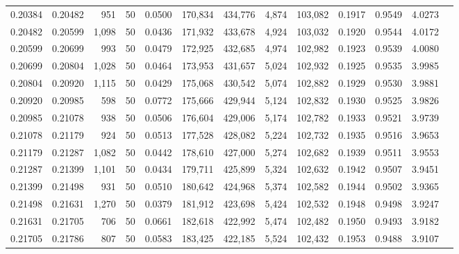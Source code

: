 \begin{tabular}{rrrrrrrrrrrrr}
0.20384 & 0.20482 &   951 &  50 &                                     0.0500 & 170,834 & 434,776 &   4,874 & 103,082 & 0.1917 & 0.9549 & 4.0273 \\
0.20482 & 0.20599 & 1,098 &  50 &                                     0.0436 & 171,932 & 433,678 &   4,924 & 103,032 & 0.1920 & 0.9544 & 4.0172 \\
0.20599 & 0.20699 &   993 &  50 &                                     0.0479 & 172,925 & 432,685 &   4,974 & 102,982 & 0.1923 & 0.9539 & 4.0080 \\
0.20699 & 0.20804 & 1,028 &  50 &                                     0.0464 & 173,953 & 431,657 &   5,024 & 102,932 & 0.1925 & 0.9535 & 3.9985 \\
0.20804 & 0.20920 & 1,115 &  50 &                                     0.0429 & 175,068 & 430,542 &   5,074 & 102,882 & 0.1929 & 0.9530 & 3.9881 \\
0.20920 & 0.20985 &   598 &  50 &                                     0.0772 & 175,666 & 429,944 &   5,124 & 102,832 & 0.1930 & 0.9525 & 3.9826 \\
0.20985 & 0.21078 &   938 &  50 &                                     0.0506 & 176,604 & 429,006 &   5,174 & 102,782 & 0.1933 & 0.9521 & 3.9739 \\
0.21078 & 0.21179 &   924 &  50 &                                     0.0513 & 177,528 & 428,082 &   5,224 & 102,732 & 0.1935 & 0.9516 & 3.9653 \\
0.21179 & 0.21287 & 1,082 &  50 &                                     0.0442 & 178,610 & 427,000 &   5,274 & 102,682 & 0.1939 & 0.9511 & 3.9553 \\
0.21287 & 0.21399 & 1,101 &  50 &                                     0.0434 & 179,711 & 425,899 &   5,324 & 102,632 & 0.1942 & 0.9507 & 3.9451 \\
0.21399 & 0.21498 &   931 &  50 &                                     0.0510 & 180,642 & 424,968 &   5,374 & 102,582 & 0.1944 & 0.9502 & 3.9365 \\
0.21498 & 0.21631 & 1,270 &  50 &                                     0.0379 & 181,912 & 423,698 &   5,424 & 102,532 & 0.1948 & 0.9498 & 3.9247 \\
0.21631 & 0.21705 &   706 &  50 &                                     0.0661 & 182,618 & 422,992 &   5,474 & 102,482 & 0.1950 & 0.9493 & 3.9182 \\
0.21705 & 0.21786 &   807 &  50 &                                     0.0583 & 183,425 & 422,185 &   5,524 & 102,432 & 0.1953 & 0.9488 & 3.9107 \\

\end{tabular}
